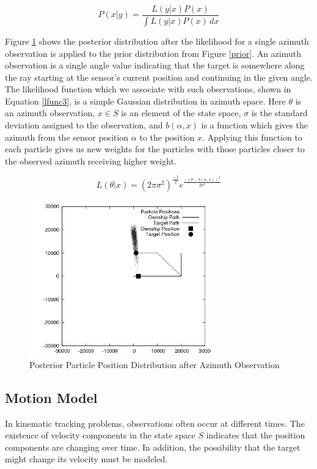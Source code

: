 \documentclass{article}
\begin{document}
\begin{equation}\label{lfunc2}
P(x|y) = \frac{L(y|x)P(x)}{\int \! L(y|x)P(x) \, dx}
\end{equation}

Figure \ref{posterior1} shows the posterior distribution after the likelihood for a single azimuth observation is applied to the prior distribution from Figure \ref{prior}. An azimuth observation is a single angle value indicating that the target is somewhere along the ray starting at the sensor's current position and continuing in the given angle. The likelihood function which we associate with such observations, shown in Equation \ref{lfunc3}, is a simple Gaussian distribution in azimuth space.\cite{bmtt} Here \(\theta\) is an azimuth observation, \(x \in S\) is an element of the state space, \(\sigma\) is the standard deviation assigned to the observation, and \(b(\alpha,x)\) is a function which gives the azimuth from the sensor position \(\alpha\) to the position \(x\). Applying this function to each particle gives us new weights for the particles with those particles closer to the observed azimuth receiving higher weight.

\begin{equation}\label{lfunc3}
L(\theta|x)=(2\pi\sigma^{2})^{\frac{-1}{2}}e^{\frac{-(\theta-b(\alpha,x))^{2}}{2\sigma^{2}}}
\end{equation}

\begin{figure}
\centering
\includegraphics[width=0.7\textwidth]{data/particles_azimuth_obs.png}
\caption{Posterior Particle Position Distribution after Azimuth Observation}
\label{posterior1}
\end{figure}

\subsection{Motion Model}
In kinematic tracking problems, observations often occur at different times. The existence of velocity components in the state space \(S\) indicates that the position components are changing over time. In addition, the possibility that the target might change its velocity must be modeled.
\end{document}
